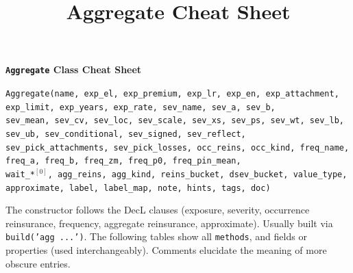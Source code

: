 %
%
%


\title{Aggregate Cheat Sheet}





{\huge{\bf \textbf{\texttt{Aggregate} Class Cheat Sheet}}}

\raggedright
\texttt{\m Aggregate(name, exp\_el, exp\_premium, exp\_lr, exp\_en, exp\_attachment, exp\_limit, exp\_years, exp\_rate, sev\_name, sev\_a, sev\_b,} \\
\texttt{\phantom{\m}sev\_mean, sev\_cv, sev\_loc, sev\_scale, sev\_xs, sev\_ps, sev\_wt, sev\_lb, sev\_ub, sev\_conditional, sev\_signed, sev\_reflect,} \\
\texttt{\phantom{\m}sev\_pick\_attachments, sev\_pick\_losses, occ\_reins, occ\_kind, freq\_name, freq\_a, freq\_b, freq\_zm, freq\_p0, freq\_pin\_mean,} \\
\texttt{\phantom{\m}wait\_*${}^{[0]}$, agg\_reins, agg\_kind, reins\_bucket, dsev\_bucket, value\_type, approximate, label, label\_map, note, hints, tags, doc)}

The constructor follows the DecL clauses (exposure, severity, occurrence reinsurance, frequency, aggregate reinsurance, approximate). Usually built via \texttt{build('agg ...')}.
The following tables show all \texttt{\m methods}, and fields or properties (used interchangeably). Comments elucidate the meaning of more obscure entries.


